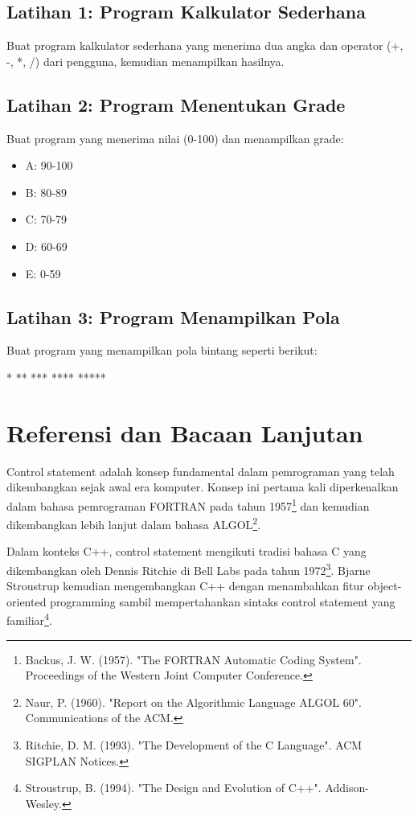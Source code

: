 \subsection{Latihan 1: Program Kalkulator Sederhana}

Buat program kalkulator sederhana yang menerima dua angka dan operator (+, -, *, /) dari pengguna, kemudian menampilkan hasilnya.

\subsection{Latihan 2: Program Menentukan Grade}

Buat program yang menerima nilai (0-100) dan menampilkan grade:
\begin{itemize}
\item A: 90-100
\item B: 80-89
\item C: 70-79
\item D: 60-69
\item E: 0-59
\end{itemize}

\subsection{Latihan 3: Program Menampilkan Pola}

Buat program yang menampilkan pola bintang seperti berikut:
\begin{lcverbatim}
*
**
***
****
*****
\end{lcverbatim}

\section{Referensi dan Bacaan Lanjutan}

Control statement adalah konsep fundamental dalam pemrograman yang telah dikembangkan sejak awal era komputer. Konsep ini pertama kali diperkenalkan dalam bahasa pemrograman FORTRAN pada tahun 1957\footnote{Backus, J. W. (1957). "The FORTRAN Automatic Coding System". Proceedings of the Western Joint Computer Conference.} dan kemudian dikembangkan lebih lanjut dalam bahasa ALGOL\footnote{Naur, P. (1960). "Report on the Algorithmic Language ALGOL 60". Communications of the ACM.}.

Dalam konteks C++, control statement mengikuti tradisi bahasa C yang dikembangkan oleh Dennis Ritchie di Bell Labs pada tahun 1972\footnote{Ritchie, D. M. (1993). "The Development of the C Language". ACM SIGPLAN Notices.}. Bjarne Stroustrup kemudian mengembangkan C++ dengan menambahkan fitur object-oriented programming sambil mempertahankan sintaks control statement yang familiar\footnote{Stroustrup, B. (1994). "The Design and Evolution of C++". Addison-Wesley.}.

